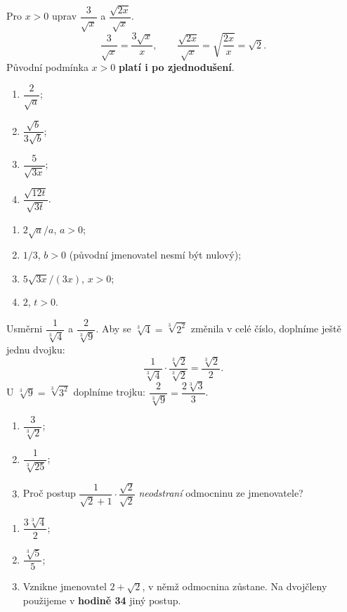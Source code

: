 \documentclass[11pt,a4paper]{article}
\begin{document}
\begin{prikladReseniBox}[breakable=false,title={Příklad 3}]
Pro $x>0$ uprav $\dfrac3{\sqrt x}$ a $\dfrac{\sqrt{2x}}{\sqrt x}$.
\tcblower
\[
\frac3{\sqrt x}=\boxed{\frac{3\sqrt x}{x}},\qquad
\frac{\sqrt{2x}}{\sqrt x}=\sqrt{\frac{2x}{x}}=\boxed{\sqrt2}.
\]
Původní podmínka $x>0$ \textbf{platí i po zjednodušení}.
\end{prikladReseniBox}
\begin{zadaniReseniBox}[breakable=false,title={Samostatná práce 3}]
\begin{enumerate}[label=\alph*)]
\item $\dfrac{2}{\sqrt a}$;
\item $\dfrac{\sqrt b}{3\sqrt b}$;
\item $\dfrac5{\sqrt{3x}}$;
\item $\dfrac{\sqrt{12t}}{\sqrt{3t}}$.
\end{enumerate}
\tcblower
\begin{enumerate}[label=\alph*)]
\item $2\sqrt a/a$, $a>0$;
\item $1/3$, $b>0$ (původní jmenovatel nesmí být nulový);
\item $5\sqrt{3x}/(3x)$, $x>0$;
\item $2$, $t>0$.
\end{enumerate}
\end{zadaniReseniBox}

\begin{prikladReseniBox}[breakable=false,title={Rozšíření 1}]
Usměrni $\dfrac1{\sqrt[3]4}$ a $\dfrac2{\sqrt[3]9}$.
\tcblower
Aby se $\sqrt[3]4=\sqrt[3]{2^2}$ změnila v celé číslo,
doplníme ještě jednu dvojku:
\[
\frac1{\sqrt[3]4}\cdot\frac{\sqrt[3]2}{\sqrt[3]2}
=\frac{\sqrt[3]2}{2}.
\]
U $\sqrt[3]9=\sqrt[3]{3^2}$ doplníme trojku:
$\dfrac2{\sqrt[3]9}=\dfrac{2\sqrt[3]3}{3}$.
\end{prikladReseniBox}

\begin{zadaniReseniBox}[breakable=false,title={Rozšíření 2}]
\begin{enumerate}[label=\alph*)]
\item $\dfrac3{\sqrt[3]2}$;
\item $\dfrac1{\sqrt[3]{25}}$;
\item Proč postup $\dfrac1{\sqrt2+1}\cdot\dfrac{\sqrt2}{\sqrt2}$
\emph{neodstraní} odmocninu ze jmenovatele?
\end{enumerate}
\tcblower
\begin{enumerate}[label=\alph*)]
\item $\dfrac{3\sqrt[3]4}{2}$;
\item $\dfrac{\sqrt[3]5}{5}$;
\item Vznikne jmenovatel $2+\sqrt2$, v němž odmocnina zůstane.
Na dvojčleny použijeme v \textbf{hodině 34} jiný postup.
\end{enumerate}
\end{zadaniReseniBox}
\end{document}
